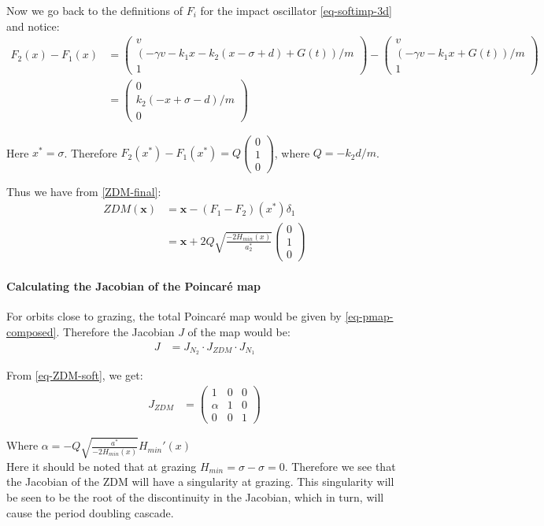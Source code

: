 \documentclass{book}
\renewcommand{\(}{\begin{columns}}
\renewcommand{\)}{\end{columns}}
\newcommand{\<}[1]{\begin{column}{#1}}
\renewcommand{\>}{\end{column}}
\newcommand{\colvt}[3]{\begin{pmatrix}#1\\#2\\#3\end{pmatrix}}
\newcommand{\bb}[1]{\textbf{#1}}
\newcommand{\para}{\paragraph}
\begin{document}
Now we go back to the definitions of $F_i$ for the impact oscillator 
\eqref{eq-softimp-3d} and notice:
\begin{align}
F_2(x)-F_1(x)
&=
\begin{pmatrix}
v\\
(-\gamma v-k_1x-k_2(x-\sigma+d)+G(t))/m\\
1
\end{pmatrix}
-
\begin{pmatrix}
v\\
(-\gamma v-k_1x+G(t))/m\\
1
\end{pmatrix}
\\
&=
\begin{pmatrix}
0\\
k_2(-x+\sigma-d)/m\\
0
\end{pmatrix}\end{align}

Here $x^*=\sigma$.  
Therefore $F_2(x^*)-F_1(x^*)=Q\colvt{0}{1}{0}$, where $Q=-k_2d/m$.  

Thus we have from \eqref{ZDM-final}:
\begin{align}
\label{eq-ZDM-soft}
ZDM(\bb{x})&=\bb{x}-(F_1-F_2)(x^*)\delta_1\\
&=\bb{x}+2Q\sqrt{\frac{-2H_{min}(x)}{a_2^*}}\colvt{0}{1}{0}
\end{align}


\para{Calculating the Jacobian of the Poincaré map}
For orbits close to grazing, the total Poincaré map would be given by 
\eqref{eq-pmap-composed}. Therefore the Jacobian $J$ of the map would be:
\begin{align}
\label{eq-jacob-composed}
{J}&={J_{N_2}}\cdot{J_{ZDM}}\cdot{J_{N_1}}
\end{align}


From \eqref{eq-ZDM-soft}, we get:
\begin{align}
\label{eq-jacob-soft}
J_{ZDM}&=
\begin{pmatrix}
1 & 0 & 0\\
\alpha & 1 & 0\\
0 & 0 & 1
\end{pmatrix}
\end{align}

Where $\alpha=-Q\sqrt{\frac{a^*}{-2H_{min}(x)}}H_{min}'(x)$\\
Here it should be noted that at grazing 
$H_{min}=\sigma-\sigma=0$.  Therefore we see that the Jacobian of the ZDM will 
have a singularity at grazing.  This singularity will be seen to be the root 
of the discontinuity in the Jacobian, which in turn, will cause the period 
doubling cascade.  
\end{document}
